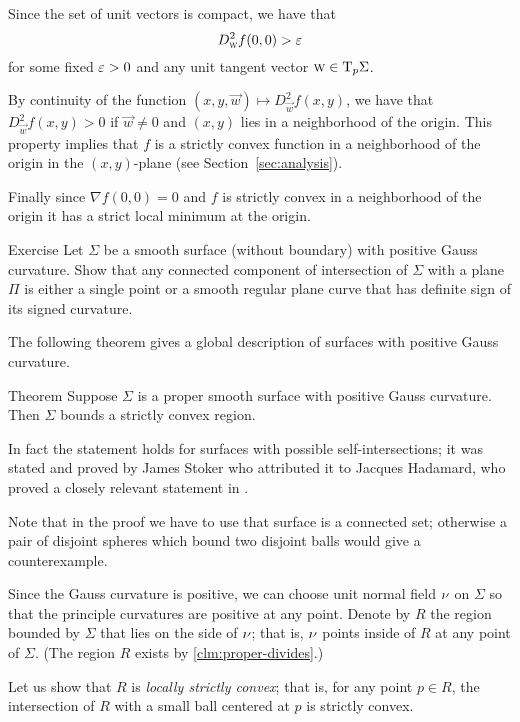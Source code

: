 Since the set of unit vectors is compact, we have that 
\[D^2_{\textsc w}f(0,0)>\varepsilon\]
for some fixed $\varepsilon>0$ and any unit tangent vector ${\textsc w}\in\mathrm{T}_p\Sigma$.

By continuity of the function $(x,y,{\vec w})\mapsto D^2_{\vec w}f(x,y)$,
we have that $D^2_{\vec w}f(x,y)>0$ if $\vec w\ne 0$ and $(x,y)$ lies in a neighborhood of the origin.
This property implies that $f$ is a strictly convex function in a neighborhood of the origin in the $(x,y)$-plane (see Section~\ref{sec:analysis}).

Finally since $\nabla f(0,0)=0$ and $f$ is strictly convex in a neighborhood of the origin it has a strict local minimum at the origin.
\qeds

\begin{thm}{Exercise}\label{ex:section-of-convex}
Let $\Sigma$ be a smooth surface (without boundary) with positive Gauss curvature.
Show that any connected component of intersection of $\Sigma$ with a plane $\Pi$ is either a single point or a smooth regular plane curve that has definite sign of its signed curvature.
\end{thm}

The following theorem gives a global description of surfaces with positive Gauss curvature.

\begin{thm}{Theorem}\label{thm:convex-embedded}
Suppose $\Sigma$ is a proper smooth surface with positive Gauss curvature.
Then $\Sigma$ bounds a strictly convex region.
\end{thm}

In fact the statement holds for surfaces with possible self-intersections; it was stated and proved by James Stoker \cite{stoker} who attributed it to Jacques Hadamard, who proved a closely relevant statement in \cite[item 23]{hadamard}.

Note that in the proof we have to use that surface is a connected set;
otherwise a pair of disjoint spheres which bound two disjoint balls would give a counterexample.

Since the Gauss curvature is positive, we can choose unit normal field $\nu$ on $\Sigma$ so that the principle curvatures are positive at any point.
Denote by $R$ the region bounded by $\Sigma$ that lies on the side of $\nu$;
that is, $\nu$ points inside of $R$ at any point of $\Sigma$.
(The region $R$ exists by \ref{clm:proper-divides}.)

Let us show that $R$ is \emph{locally strictly convex};
that is, for any point $p\in R$, the intersection of $R$ with a small ball centered at $p$ is strictly convex.

